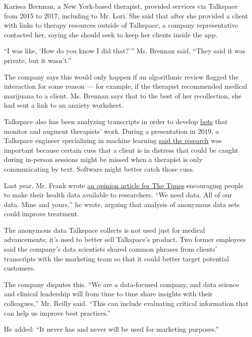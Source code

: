 Karissa Brennan, a New York-based therapist, provided services via
Talkspace from 2015 to 2017, including to Mr. Lori. She said that after
she provided a client with links to therapy resources outside of
Talkspace, a company representative contacted her, saying she should
seek to keep her clients inside the app.

``I was like, `How do you know I did that?''' Ms. Brennan said. ``They
said it was private, but it wasn't.''

The company says this would only happen if an algorithmic review flagged
the interaction for some reason --- for example, if the therapist
recommended medical marijuana to a client. Ms. Brennan says that to the
best of her recollection, she had sent a link to an anxiety worksheet.

Talkspace also has been analyzing transcripts in order to develop
\href{https://news.bloomberglaw.com/privacy-and-data-security/talkspace-wants-to-build-a-better-therapist-with-ai-listening-in}{bots}
that monitor and augment therapists' work. During a presentation in
2019, a Talkspace engineer specializing in machine learning
\href{https://www.youtube.com/watch?v=aq0AhbvxBkc\&feature=emb_logo}{said
the research} was important because certain cues that a client is in
distress that could be caught during in-person sessions might be missed
when a therapist is only communicating by text. Software might better
catch those cues.

Last year, Mr. Frank wrote
\href{https://www.nytimes.com/2019/10/02/opinion/health-care-data-privacy.html}{an
opinion article for The Times} encouraging people to make their health
data available to researchers. ``We need data. All of our data. Mine and
yours,'' he wrote, arguing that analysis of anonymous data sets could
improve treatment.

The anonymous data Talkspace collects is not used just for medical
advancements; it's used to better sell Talkspace's product. Two former
employees said the company's data scientists shared common phrases from
clients' transcripts with the marketing team so that it could better
target potential customers.

The company disputes this. ``We are a data-focused company, and data
science and clinical leadership will from time to time share insights
with their colleagues,'' Mr. Reilly said. ``This can include evaluating
critical information that can help us improve best practices.''

He added: ``It never has and never will be used for marketing
purposes.''


